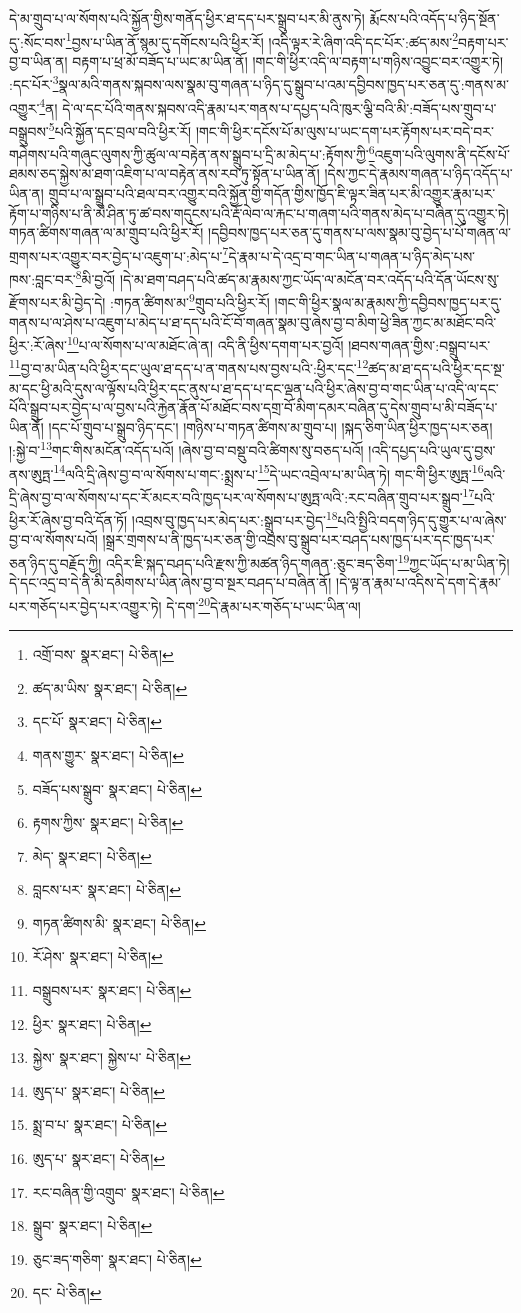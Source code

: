དེ་མ་གྲུབ་པ་ལ་སོགས་པའི་སྐྱོན་གྱིས་གནོད་ཕྱིར་ཐ་དད་པར་སྒྲུབ་པར་མི་ནུས་ཏེ། རྨོངས་པའི་འདོད་པ་ཉིད་སྔོན་དུ་:སོང་བས་\footnote{འགྲོ་བས་  སྣར་ཐང་།  པེ་ཅིན། }བྱས་པ་ཡིན་ནོ་སྙམ་དུ་དགོངས་པའི་ཕྱིར་རོ། །འདི་ལྟར་རེ་ཞིག་འདི་དང་པོར་:ཚད་མས་\footnote{ཚད་མ་ཡིས་  སྣར་ཐང་།  པེ་ཅིན། }བརྟག་པར་བྱ་བ་ཡིན་ན། བརྟག་པ་ཕྲ་མོ་བཟོད་པ་ཡང་མ་ཡིན་ནོ། །གང་གི་ཕྱིར་འདི་ལ་བརྟག་པ་གཉིས་འབྱུང་བར་འགྱུར་ཏེ། :དང་པོར་\footnote{དང་པོ་  སྣར་ཐང་།  པེ་ཅིན། }སྣལ་མའི་གནས་སྐབས་ལས་སྣམ་བུ་གཞན་པ་ཉིད་དུ་སྒྲུབ་པ་འམ་དབྱིབས་ཁྱད་པར་ཅན་དུ་:གནས་མ་འགྱུར་\footnote{གནས་གྱུར་  སྣར་ཐང་།  པེ་ཅིན། }ན། དེ་ལ་དང་པོའི་གནས་སྐབས་འདི་རྣམ་པར་གནས་པ་དཔྱད་པའི་ཁུར་ལྕི་བའི་མི་:བཟོད་པས་གྲུབ་པ་བསྒྲུབས་\footnote{བཟོད་པས་སྒྲུབ་  སྣར་ཐང་།  པེ་ཅིན། }པའི་སྐྱོན་དང་བྲལ་བའི་ཕྱིར་རོ། །གང་གི་ཕྱིར་དངོས་པོ་མ་ལུས་པ་ཡང་དག་པར་རྟོགས་པར་བདེ་བར་གཤེགས་པའི་གཞུང་ལུགས་ཀྱི་ཚུལ་ལ་བརྟེན་ནས་སྒྲུབ་པ་དྲི་མ་མེད་པ་:རྟོགས་ཀྱི་\footnote{རྟགས་ཀྱིས་  སྣར་ཐང་།  པེ་ཅིན། }འཇུག་པའི་ལུགས་ནི་དངོས་པོ་ཐམས་ཅད་སྐྱེས་མ་ཐག་འཇིག་པ་ལ་བརྟེན་ནས་རབ་ཏུ་སྟོན་པ་ཡིན་ནོ། །དེས་ཀྱང་དེ་རྣམས་གཞན་པ་ཉིད་འདོད་པ་ཡིན་ན། གྲུབ་པ་ལ་སྒྲུབ་པའི་ཐལ་བར་འགྱུར་བའི་སྐྱོན་གྱི་གདོན་གྱིས་ཁྱོད་ཇི་ལྟར་ཟིན་པར་མི་འགྱུར་རྣམ་པར་རྟོག་པ་གཉིས་པ་ནི་མེ་ཤིན་ཏུ་ཚ་བས་གདུངས་པའི་རྡོ་ལེབ་ལ་རྐང་པ་གཞག་པའི་གནས་མེད་པ་བཞིན་དུ་འགྱུར་ཏེ། གཏན་ཚིགས་གཞན་ལ་མ་གྲུབ་པའི་ཕྱིར་རོ། །དབྱིབས་ཁྱད་པར་ཅན་དུ་གནས་པ་ལས་སྣམ་བུ་བྱེད་པ་པོ་གཞན་ལ་གྲགས་པར་འགྱུར་བར་བྱེད་པ་འཇུག་པ་:མེད་པ་\footnote{མེད་  སྣར་ཐང་།  པེ་ཅིན། }དེ་རྣམ་པ་དེ་འདྲ་བ་གང་ཡིན་པ་གཞན་པ་ཉིད་མེད་པས་ཁས་:བླང་བར་\footnote{བླངས་པར་  སྣར་ཐང་།  པེ་ཅིན། }མི་བྱའོ། །དེ་མ་ཐག་བཤད་པའི་ཚད་མ་རྣམས་ཀྱང་ཡོད་ལ་མངོན་བར་འདོད་པའི་དོན་ཡོངས་སུ་རྫོགས་པར་མི་བྱེད་དེ། :གཏན་ཚིགས་མ་\footnote{གཏན་ཚིགས་མི་  སྣར་ཐང་།  པེ་ཅིན། }གྲུབ་པའི་ཕྱིར་རོ། །གང་གི་ཕྱིར་སྣལ་མ་རྣམས་ཀྱི་དབྱིབས་ཁྱད་པར་དུ་གནས་པ་ལ་ཤེས་པ་འཇུག་པ་མེད་པ་ཐ་དད་པའི་ངོ་བོ་གཞན་སྣམ་བུ་ཞེས་བྱ་བ་མིག་ཕྱེ་ཟིན་ཀྱང་མ་མཐོང་བའི་ཕྱིར་:རོ་ཞེས་\footnote{རོ་ཤེས་  སྣར་ཐང་།  པེ་ཅིན། }པ་ལ་སོགས་པ་ལ་མཐོང་ཞེ་ན། འདི་ནི་ཕྱིས་དགག་པར་བྱའོ། །ཐབས་གཞན་གྱིས་:བསྒྲུབ་པར་\footnote{བསྒྲུབས་པར་  སྣར་ཐང་།  པེ་ཅིན། }བྱ་བ་མ་ཡིན་པའི་ཕྱིར་དང་ཡུལ་ཐ་དད་པ་ན་གནས་པས་བྱས་པའི་:ཕྱིར་དང་\footnote{ཕྱིར་  སྣར་ཐང་།  པེ་ཅིན། }ཚད་མ་ཐ་དད་པའི་ཕྱིར་དང་སྔ་མ་དང་ཕྱི་མའི་དུས་ལ་ལྟོས་པའི་ཕྱིར་དང་ནུས་པ་ཐ་དད་པ་དང་ལྡན་པའི་ཕྱིར་ཞེས་བྱ་བ་གང་ཡིན་པ་འདི་ལ་དང་པོའི་སྒྲུབ་པར་བྱེད་པ་ལ་བྱས་པའི་རྐྱེན་རྣོན་པོ་མཐོང་བས་དགྲ་བོ་མིག་དམར་བཞིན་དུ་དེས་གྲུབ་པ་མི་བཟོད་པ་ཡིན་ནོ། །དང་པོ་གྲུབ་པ་སྒྲུབ་ཉིད་དང་། །གཉིས་པ་གཏན་ཚིགས་མ་གྲུབ་པ། །སྐད་ཅིག་ཡིན་ཕྱིར་ཁྱད་པར་ཅན། །:སྐྱེ་བ་\footnote{སྐྱེས་  སྣར་ཐང་། སྐྱེས་པ་  པེ་ཅིན། }གང་གིས་མངོན་འདོད་པའོ། །ཞེས་བྱ་བ་བསྡུ་བའི་ཚིགས་སུ་བཅད་པའོ། །འདི་དཔྱད་པའི་ཡུལ་དུ་བྱས་ནས་ཨུཏྤ་\footnote{ཨུད་པ་  སྣར་ཐང་།  པེ་ཅིན། }ལའི་དྲི་ཞེས་བྱ་བ་ལ་སོགས་པ་གང་:སྨྲས་པ་\footnote{སྨྲ་བ་པ་  སྣར་ཐང་།  པེ་ཅིན། }དེ་ཡང་འབྲེལ་པ་མ་ཡིན་ཏེ། གང་གི་ཕྱིར་ཨུཏྤ་\footnote{ཨུད་པ་  སྣར་ཐང་།  པེ་ཅིན། }ལའི་དྲི་ཞེས་བྱ་བ་ལ་སོགས་པ་དང་རོ་མངར་བའི་ཁྱད་པར་ལ་སོགས་པ་ཨུཏྤ་ལའི་:རང་བཞིན་གྲུབ་པར་སྒྲུབ་\footnote{རང་བཞིན་གྱི་འགྲུབ་  སྣར་ཐང་།  པེ་ཅིན། }པའི་ཕྱིར་རོ་ཞེས་བྱ་བའི་དོན་ཏོ། །འབྲས་བུ་ཁྱད་པར་མེད་པར་:སྒྲུབ་པར་བྱེད་\footnote{སྒྲུབ་  སྣར་ཐང་།  པེ་ཅིན། }པའི་སྤྱིའི་བདག་ཉིད་དུ་གྱུར་པ་ལ་ཞེས་བྱ་བ་ལ་སོགས་པའོ། །སྒྲར་གྲགས་པ་ནི་ཁྱད་པར་ཅན་གྱི་འབྲས་བུ་སྒྲུབ་པར་བཤད་པས་ཁྱད་པར་དང་ཁྱད་པར་ཅན་ཉིད་དུ་བརྗོད་ཀྱི། འདིར་ཇི་སྐད་བཤད་པའི་རྫས་ཀྱི་མཚན་ཉིད་གཞན་:ཅུང་ཟད་ཅིག་\footnote{ཅུང་ཟད་གཅིག་  སྣར་ཐང་།  པེ་ཅིན། }ཀྱང་ཡོད་པ་མ་ཡིན་ཏེ། དེ་དང་འདྲ་བ་དེ་ནི་མི་དམིགས་པ་ཡིན་ཞེས་བྱ་བ་སྔར་བཤད་པ་བཞིན་ནོ། །དེ་ལྟ་ན་རྣམ་པ་འདིས་དེ་དག་དེ་རྣམ་པར་གཅོད་པར་བྱེད་པར་འགྱུར་ཏེ། དེ་དག་\footnote{དང་  པེ་ཅིན། }དེ་རྣམ་པར་གཅོད་པ་ཡང་ཡིན་ལ། 